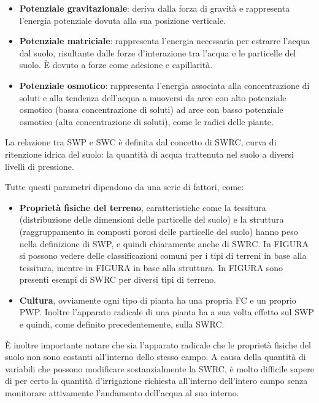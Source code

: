 \documentclass[12pt,a4paper,openright,twoside]{book}
\begin{document}
\begin{itemize}[noitemsep]
    \item \textbf{Potenziale gravitazionale}: deriva dalla forza di gravità e rappresenta l'energia potenziale dovuta alla sua posizione verticale.
    \item \textbf{Potenziale matriciale}:  rappresenta l'energia necessaria per estrarre l'acqua dal suolo, risultante dalle forze d'interazione tra l'acqua e le particelle del suolo. È dovuto a forze come adesione e capillarità.
    \item \textbf{Potenziale osmotico}: rappresenta l'energia associata alla concentrazione di soluti e alla tendenza dell'acqua a muoversi da aree con alto potenziale osmotico (bassa concentrazione di soluti) ad aree con basso potenziale osmotico (alta concentrazione di soluti), come le radici delle piante.
\end{itemize}

La relazione tra \ac{SWP} e \ac{SWC} è definita dal concetto di \ac{SWRC}, curva di ritenzione idrica del suolo: la quantità di acqua trattenuta nel suolo a diversi livelli di pressione.

Tutte questi parametri dipendono da una serie di fattori, come:
\begin{itemize}[noitemsep]
    \item \textbf{Proprietà fisiche del terreno}, caratteristiche come la tessitura (distribuzione delle dimensioni delle particelle del suolo) e la struttura (raggruppamento in composti porosi delle particelle del suolo) hanno peso nella definizione di \ac{SWP}, e quindi chiaramente anche di \ac{SWRC}. In FIGURA si possono vedere delle classificazioni comuni per i tipi di terreni in base alla tessitura, mentre in FIGURA in base alla struttura. In FIGURA sono presenti esempi di \ac{SWRC} per diversi tipi di terreno.
    \item \textbf{Cultura}, ovviamente ogni tipo di pianta ha una propria \ac{FC} e un proprio \ac{PWP}. Inoltre l'apparato radicale di una pianta ha a sua volta effetto sul \ac{SWP} e quindi, come definito precedentemente, sulla \ac{SWRC}.
\end{itemize}

È inoltre importante notare che sia l'apparato radicale che le proprietà fisiche del suolo non sono costanti all'interno dello stesso campo. A causa della quantità di variabili che possono modificare sostanzialmente la \ac{SWRC}, è molto difficile sapere di per certo la quantità d'irrigazione richiesta all'interno dell'intero campo senza monitorare attivamente l'andamento dell'acqua al suo interno.
\end{document}
